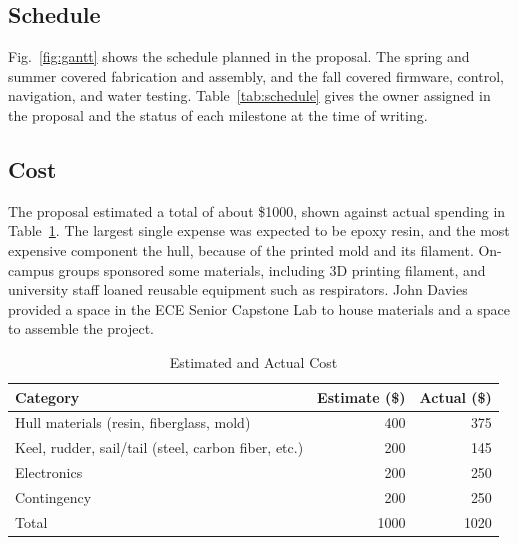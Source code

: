 \subsection{Schedule}
Fig.~\ref{fig:gantt} shows the schedule planned in the proposal. The spring
and summer covered fabrication and assembly, and the fall covered firmware,
control, navigation, and water testing. Table~\ref{tab:schedule} gives the
owner assigned in the proposal and the status of each milestone at the time
of writing.

\subsection{Cost}
The proposal estimated a total of about \$1000, shown against actual
spending in Table~\ref{tab:cost}. The largest single expense was expected to be
epoxy resin, and the most expensive component the hull, because of the
printed mold and its filament. On-campus groups sponsored some materials,
including 3D printing filament, and university staff loaned reusable
equipment such as respirators. John Davies provided a space in the ECE Senior Capstone Lab to house materials and a space to assemble the project.

\begin{table}[!htb]
\caption{Estimated and Actual Cost}
\label{tab:cost}
\centering
\begin{tabular}{@{}lrr@{}}
\toprule
Category & Estimate (\$) & Actual (\$) \\
\midrule
Hull materials (resin, fiberglass, mold) & 400 & 375 \\
Keel, rudder, sail/tail (steel, carbon fiber, etc.)    & 200 & 145 \\
Electronics                              & 200 & 250 \\
Contingency                              & 200 & 250 \\
\midrule
Total                                    & 1000 &  1020\\
\bottomrule
\end{tabular}
\end{table}